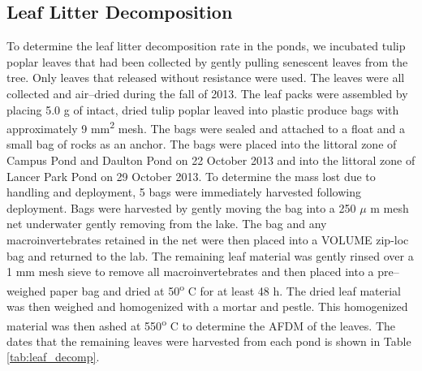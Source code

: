 \subsection{Leaf Litter Decomposition}

To determine the leaf litter decomposition rate in the ponds, we incubated tulip poplar leaves that had been collected by gently pulling senescent leaves from the tree. Only leaves that released without resistance were used.  The leaves were all collected and air--dried during the fall of 2013.  The leaf packs were assembled by placing 5.0 g of intact, dried tulip poplar leaved into plastic produce bags with approximately 9 mm\textsuperscript{2} mesh. The bags were sealed and attached to a float and a small bag of rocks as an anchor.  The bags were placed into the littoral zone of Campus Pond and Daulton Pond on 22 October 2013 and into the littoral zone of Lancer Park Pond on 29 October 2013. To determine the mass lost due to handling and deployment, 5 bags were immediately harvested following deployment. Bags were harvested by gently moving the bag into a 250 $\mu$ m mesh net underwater gently removing from the lake. The bag and any macroinvertebrates retained in the net were then placed into a VOLUME zip-loc bag and returned to the lab.  The remaining leaf material was gently rinsed over a 1 mm mesh sieve to remove all macroinvertebrates and then placed into a pre--weighed paper bag and dried at 50\textsuperscript{o} C for at least 48 h.  The dried leaf material was then weighed and homogenized with a mortar and pestle. This homogenized material was then ashed at 550\textsuperscript{o} C to determine the AFDM of the leaves. The dates that the remaining leaves were harvested from each pond is shown in Table \ref{tab:leaf_decomp}. 
